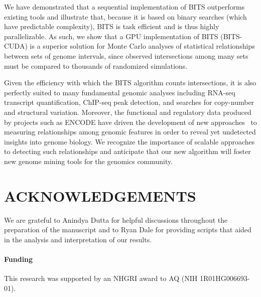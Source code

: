 \documentclass{bioinfo}
\begin{document}
We have demonstrated that a sequential implementation of BITS outperforms 
existing tools and illustrate that, because it is based on binary searches
(which have predictable complexity), BITS is task efficient and is thus highly 
parallelizable. As such, we show that a GPU implementation of BITS (BITS-CUDA)
is a superior solution for Monte Carlo analyses of statistical relationships 
between sets of genome intervals, since observed intersections among many sets 
must be compared to thousands of randomized simulations.

Given the efficiency with which the BITS algorithm counts intersections,
it is also perfectly suited to many fundamental genomic analyses
including RNA-seq transcript quantification, ChIP-seq peak detection, and 
searches for copy-number and structural variation. Moreover, the 
functional and regulatory data produced by projects such as ENCODE
have driven the development of new approaches~\citep{favorov2012} 
to measuring relationships among genomic features in order to reveal yet 
undetected insights into genome biology. We recognize the importance of 
scalable approaches to detecting such relationships and anticipate that 
our new algorithm will foster new genome mining tools for the 
genomics community.
\vspace{-2em}
\section*{ACKNOWLEDGEMENTS}
We are grateful to Anindya Dutta for helpful discussions throughout the
preparation of the manuscript and to Ryan Dale for providing scripts that
aided in the analysis and interpretation of our results.

\paragraph{Funding\textcolon} This research was supported by an NHGRI award to AQ (NIH 1R01HG006693-01).
\vspace{-2em}
        
        
\end{document}
